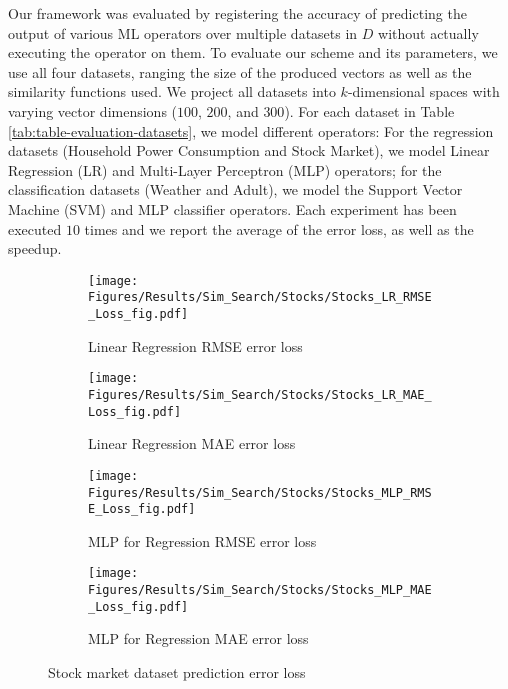 Our framework was evaluated by registering the accuracy of predicting the output of various ML operators over multiple datasets in $D$ without actually executing the operator on them. To evaluate our scheme and its parameters, we use all four datasets, ranging the size of the produced vectors as well as the similarity functions used.
We project all datasets into $k$-dimensional spaces with varying vector dimensions ($100$, $200$, and $300$). For each dataset in Table \ref{tab:table-evaluation-datasets}, we model different operators: For the regression datasets (Household Power Consumption and Stock Market), we model Linear Regression (LR) and Multi-Layer Perceptron (MLP) operators; for the classification datasets (Weather and Adult), we model the Support Vector Machine (SVM) and MLP classifier operators. Each experiment has been executed $10$ times and we report the average of the error loss, as well as the speedup. 

\begin{figure}[!t]
     \centering
     \begin{subfigure}[b]{0.24\textwidth}
         \centering
         \texttt{[image: Figures/Results/Sim\_Search/Stocks/Stocks\_LR\_RMSE\_Loss\_fig.pdf]}
         \caption{Linear Regression RMSE error loss}
         \label{fig:Stock-LR-RMSE}
     \end{subfigure}
     \hfill 
     \begin{subfigure}[b]{0.24\textwidth}
         \centering
         \texttt{[image: Figures/Results/Sim\_Search/Stocks/Stocks\_LR\_MAE\_Loss\_fig.pdf]}
         \caption{Linear Regression MAE error loss}
         \label{fig:Stock-LR-MAE}
     \end{subfigure}
        
     \begin{subfigure}[b]{0.24\textwidth}
         \centering
         \texttt{[image: Figures/Results/Sim\_Search/Stocks/Stocks\_MLP\_RMSE\_Loss\_fig.pdf]}
         \caption{MLP for Regression RMSE error loss}
         \label{fig:Stock-MLP-RMSE}
     \end{subfigure}
     \hfill 
     \begin{subfigure}[b]{0.24\textwidth}
         \centering
         \texttt{[image: Figures/Results/Sim\_Search/Stocks/Stocks\_MLP\_MAE\_Loss\_fig.pdf]}
         \caption{MLP for Regression MAE error loss}
         \label{fig:Stock-MLP-MAE}
     \end{subfigure}
        \caption{Stock market dataset prediction error loss}
        \label{fig:Stock-EVAL-RES}
\end{figure}
